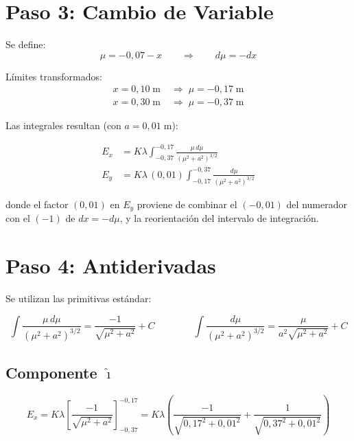 \documentclass[12pt,letterpaper]{article}
\begin{document}
\section*{Paso 3: Cambio de Variable}

Se define:
\begin{equation*}
    \mu = -0{,}07 - x \qquad \Rightarrow \qquad d\mu = -dx
\end{equation*}

L\'imites transformados:
\begin{align*}
    x = 0{,}10\;\text{m} &\;\Rightarrow\; \mu = -0{,}17\;\text{m}\\
    x = 0{,}30\;\text{m} &\;\Rightarrow\; \mu = -0{,}37\;\text{m}
\end{align*}

Las integrales resultan (con $a = 0{,}01\;\text{m}$):

\begin{align*}
    E_x &= K\lambda\int_{-0{,}37}^{-0{,}17}
            \frac{\mu\,d\mu}{(\mu^2 + a^2)^{3/2}}
    \\[8pt]
    E_y &= K\lambda\,(0{,}01)\int_{-0{,}17}^{-0{,}37}
            \frac{d\mu}{(\mu^2 + a^2)^{3/2}}
\end{align*}

donde el factor $(0{,}01)$ en $E_y$ proviene de combinar el $(-0{,}01)$ del numerador con el $(-1)$ de $dx = -d\mu$, y la reorientaci\'on del intervalo de integraci\'on.

\section*{Paso 4: Antiderivadas}

Se utilizan las primitivas est\'andar:

\begin{equation*}
    \int \frac{\mu\,d\mu}{(\mu^2+a^2)^{3/2}} = \frac{-1}{\sqrt{\mu^2+a^2}} + C
    \qquad\qquad
    \int \frac{d\mu}{(\mu^2+a^2)^{3/2}} = \frac{\mu}{a^2\sqrt{\mu^2+a^2}} + C
\end{equation*}

\subsection*{Componente $\hat{\imath}$}

\begin{equation*}
    E_x = K\lambda \left[\frac{-1}{\sqrt{\mu^2 + a^2}}\right]_{-0{,}37}^{-0{,}17}
        = K\lambda \left(\frac{-1}{\sqrt{0{,}17^2+0{,}01^2}}
                        + \frac{1}{\sqrt{0{,}37^2+0{,}01^2}}\right)
\end{equation*}
\end{document}
